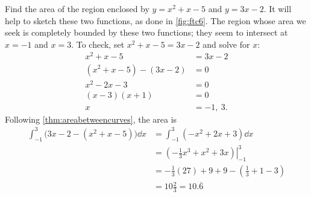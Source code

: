 \begin{example}\label{ex_ftc6}
Find the area of the region enclosed by $y=x^2+x-5$ and $y=3x-2$.
\solution
It will help to sketch these two functions, as done in \autoref{fig:ftc6}. 
The region whose area we seek is completely bounded by these two functions; they seem to intersect at $x=-1$ and $x=3$. To check, set $x^2+x-5=3x-2$ and solve for $x$:\vspace{-.5\baselineskip}
\begin{align*}
	x^2+x-5 &= 3x-2 \\
	(x^2+x-5) - (3x-2) &= 0\\
	x^2-2x-3 &= 0\\
	(x-3)(x+1) &= 0\\
	x&=-1,\ 3.
\end{align*}
Following \autoref{thm:areabetweencurves}, the area is 
\begin{align*}
	\int_{-1}^3\bigl(3x-2 -(x^2+x-5)\bigr)\dd x &= \int_{-1}^3 (-x^2+2x+3)\dd x \\
	&=\left.\left(-\frac13x^3+x^2+3x\right)\right|_{-1}^3 \\
	&=-\frac13(27)+9+9-\left(\frac13+1-3\right)\\
	&= 10\frac23 = 10.\overline{6}
\end{align*}
\end{example}

